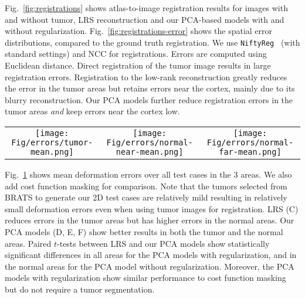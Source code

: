 \documentclass{article}
\begin{document}
Fig.~\ref{fig:registrations} shows atlas-to-image registration results for images with and without tumor, LRS reconstruction and our PCA-based models with and without regularization. Fig.~\ref{fig:registrations-error} shows the spatial error distributions, compared to the ground truth registration. We use \texttt{NiftyReg}~\cite{modat2010} (with standard settings) and NCC for registrations. Errors are computed using Euclidean distance. Direct registration of the tumor image results in large registration errors. Registration to the low-rank reconstruction greatly reduces the error in the tumor areas but retains errors near the cortex, mainly due to its blurry reconstruction. Our PCA models further reduce registration errors in the tumor areas \emph{and} keep errors near the cortex low.
\begin{table}[htb]
	\centering
	\begin{tabular}{@{}c@{}c@{}c@{}}
			\texttt{[image: Fig/errors/tumor-mean.png]} &
			\texttt{[image: Fig/errors/normal-near-mean.png]} &
			\texttt{[image: Fig/errors/normal-far-mean.png]}\\[-3mm]
	\end{tabular}
	\label{fig:errors}
\end{table}

Fig.~\ref{fig:errors} shows mean deformation errors over all test cases in the 3 areas. We also add cost function masking for comparison. Note that the tumors selected from BRATS to generate our 2D test cases are relatively mild resulting in relatively small deformation errors even when using tumor images for registration. LRS (C) reduces errors in the tumor areas but has higher errors in the normal areas. Our PCA models (D, E, F) show better results in both the tumor and the normal areas. Paired $t$-tests between LRS and our PCA models show statistically significant differences in all areas for the PCA models with regularization, and in the normal areas for the PCA model without regularization. Moreover, the PCA models with regularization show similar performance to cost function masking but do not require a tumor segmentation.
\end{document}
